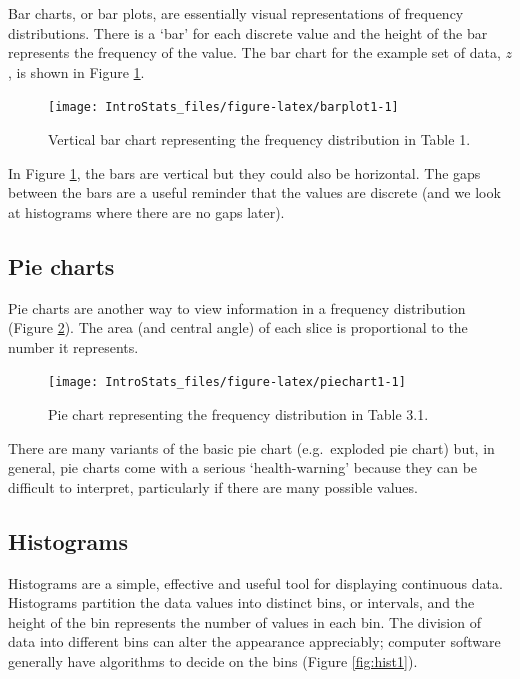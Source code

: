 \documentclass[
  oneside]{krantz}
\begin{document}
Bar charts, or bar plots, are essentially visual representations of frequency distributions. There is a `bar' for each discrete value and the height of the bar represents the frequency of the value. The bar chart for the example set of data, \(z\), is shown in Figure \ref{fig:barplot1}.

\begin{figure}

{\centering \texttt{[image: IntroStats\_files/figure-latex/barplot1-1]} 

}

\caption{Vertical bar chart representing the frequency distribution in Table 1.}\label{fig:barplot1}
\end{figure}

In Figure \ref{fig:barplot1}, the bars are vertical but they could also be horizontal. The gaps between the bars are a useful reminder that the values are discrete (and we look at histograms where there are no gaps later).

\hypertarget{pie-charts}{%
\subsection{Pie charts}\label{pie-charts}}

Pie charts are another way to view information in a frequency distribution (Figure \ref{fig:piechart1}). The area (and central angle) of each slice is proportional to the number it represents.

\begin{figure}

{\centering \texttt{[image: IntroStats\_files/figure-latex/piechart1-1]} 

}

\caption{Pie chart representing the frequency distribution in Table 3.1.}\label{fig:piechart1}
\end{figure}

There are many variants of the basic pie chart (e.g.~exploded pie chart) but, in general, pie charts come with a serious `health-warning' because they can be difficult to interpret, particularly if there are many possible values.

\hypertarget{histograms}{%
\subsection{Histograms}\label{histograms}}

Histograms are a simple, effective and useful tool for displaying continuous data. Histograms partition the data values into distinct bins, or intervals, and the height of the bin represents the number of values in each bin. The division of data into different bins can alter the appearance appreciably; computer software generally have algorithms to decide on the bins (Figure \ref{fig:hist1}).
\end{document}
